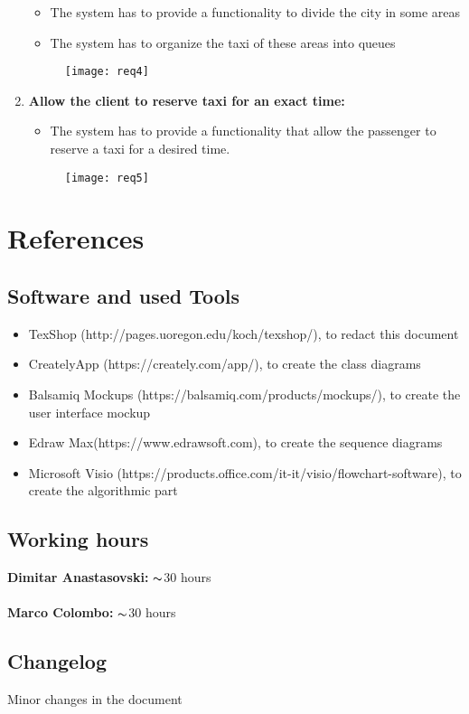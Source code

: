 \documentclass[12pt, oneside]{book}   	%
\begin{document}
\begin{enumerate}
\begin{itemize}
\item The system has to provide a functionality to divide the city in some areas
\item The system has to organize the taxi of these areas into queues
\end{itemize}
\vspace{2cm}
\begin{figure}[h]
\center \texttt{[image: req4]}
\end{figure}
\clearpage
\item \textbf{Allow the client to reserve taxi for an exact time:}
\begin{itemize}
\item The system has to provide a functionality that allow the passenger to reserve a taxi for a desired time.
\end{itemize}
\vspace{3cm}
\begin{figure}[h]
\center \texttt{[image: req5]}
\end{figure}
\end{enumerate}
\chapter{References}
\section{Software and used Tools}
\begin{itemize}
\item TexShop (http://pages.uoregon.edu/koch/texshop/), to redact this document
\item CreatelyApp (https://creately.com/app/), to create the class diagrams
\item Balsamiq Mockups (https://balsamiq.com/products/mockups/), to create the user interface mockup
\item Edraw Max(https://www.edrawsoft.com), to create the sequence diagrams
\item Microsoft Visio (https://products.office.com/it-it/visio/flowchart-software), to create the algorithmic part
\end{itemize}
\section{Working hours}
\textbf{Dimitar Anastasovski:} $\thicksim$30 hours
\\
\\
\textbf{Marco Colombo:} $\thicksim$30 hours
\section{Changelog}
Minor changes in the document
\end{document}

